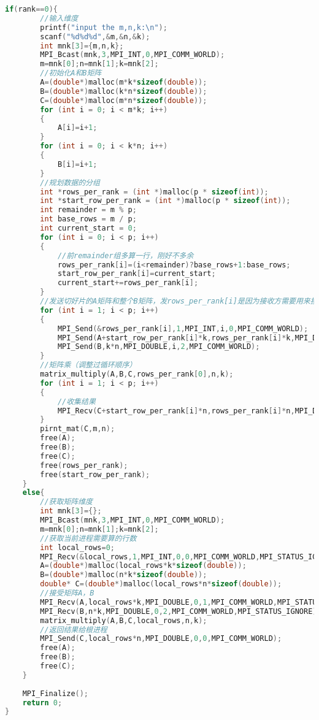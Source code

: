 \documentclass{SYSUReport}
\begin{document}
\begin{lstlisting}[language=c++]
    if(rank==0){
        //输入维度
        printf("input the m,n,k:\n");
        scanf("%d%d%d",&m,&n,&k);
        int mnk[3]={m,n,k};
        MPI_Bcast(mnk,3,MPI_INT,0,MPI_COMM_WORLD);
        m=mnk[0];n=mnk[1];k=mnk[2];
        //初始化A和B矩阵
        A=(double*)malloc(m*k*sizeof(double));
        B=(double*)malloc(k*n*sizeof(double));
        C=(double*)malloc(m*n*sizeof(double));
        for (int i = 0; i < m*k; i++)
        {
            A[i]=i+1;
        }
        for (int i = 0; i < k*n; i++)
        {
            B[i]=i+1;
        }
        //规划数据的分组
        int *rows_per_rank = (int *)malloc(p * sizeof(int));
        int *start_row_per_rank = (int *)malloc(p * sizeof(int));
        int remainder = m % p;
        int base_rows = m / p;
        int current_start = 0;
        for (int i = 0; i < p; i++)
        {
            //前remainder组多算一行，刚好不多余
            rows_per_rank[i]=(i<remainder)?base_rows+1:base_rows;
            start_row_per_rank[i]=current_start;
            current_start+=rows_per_rank[i];
        }
        //发送切好片的A矩阵和整个B矩阵，发rows_per_rank[i]是因为接收方需要用来接收矩阵A和发送矩阵C
        for (int i = 1; i < p; i++)
        {
            MPI_Send(&rows_per_rank[i],1,MPI_INT,i,0,MPI_COMM_WORLD);
            MPI_Send(A+start_row_per_rank[i]*k,rows_per_rank[i]*k,MPI_DOUBLE,i,1,MPI_COMM_WORLD);
            MPI_Send(B,k*n,MPI_DOUBLE,i,2,MPI_COMM_WORLD);
        }
        //矩阵乘（调整过循环顺序）
        matrix_multiply(A,B,C,rows_per_rank[0],n,k);
        for (int i = 1; i < p; i++)
        {
            //收集结果
            MPI_Recv(C+start_row_per_rank[i]*n,rows_per_rank[i]*n,MPI_DOUBLE,i,0,MPI_COMM_WORLD,MPI_STATUS_IGNORE);
        }
        pirnt_mat(C,m,n);
        free(A);
        free(B);
        free(C);
        free(rows_per_rank);
        free(start_row_per_rank);
    }
    else{
        //获取矩阵维度
        int mnk[3]={};
        MPI_Bcast(mnk,3,MPI_INT,0,MPI_COMM_WORLD);
        m=mnk[0];n=mnk[1];k=mnk[2];
        //获取当前进程需要算的行数
        int local_rows=0;
        MPI_Recv(&local_rows,1,MPI_INT,0,0,MPI_COMM_WORLD,MPI_STATUS_IGNORE);
        A=(double*)malloc(local_rows*k*sizeof(double));
        B=(double*)malloc(n*k*sizeof(double));
        double* C=(double*)malloc(local_rows*n*sizeof(double));
        //接受矩阵A，B
        MPI_Recv(A,local_rows*k,MPI_DOUBLE,0,1,MPI_COMM_WORLD,MPI_STATUS_IGNORE);
        MPI_Recv(B,n*k,MPI_DOUBLE,0,2,MPI_COMM_WORLD,MPI_STATUS_IGNORE);
        matrix_multiply(A,B,C,local_rows,n,k);
        //返回结果给根进程
        MPI_Send(C,local_rows*n,MPI_DOUBLE,0,0,MPI_COMM_WORLD);
        free(A);
        free(B);
        free(C);
    }
    
    MPI_Finalize();
    return 0;
}
\end{lstlisting}
\end{document}
